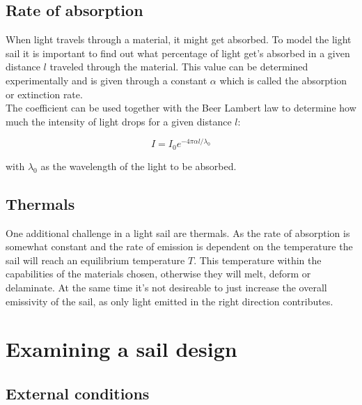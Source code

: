 \documentclass[14pt]{article}
\begin{document}
\subsection{Rate of absorption}
When light travels through a material, it might get absorbed. To model the light sail it is important to find out what percentage of light get's
absorbed in a given distance $l$ traveled through the material. This value can be determined experimentally and is given through a constant
$\alpha$ which is called the absorption or extinction rate. 
\\
The coefficient can be used together with the Beer Lambert law to determine how much the intensity of light drops for a given distance $l$:

\begin{equation}
  I = I_0 e^{- 4 \pi \alpha l / \lambda_0 }
  \label{eq:absorption}
\end{equation}


with $\lambda_0$ as the wavelength of the light to be absorbed.

\subsection{Thermals}

One additional challenge in a light sail are thermals. As the rate of absorption is somewhat constant and the rate of emission is dependent on the temperature
the sail will reach an equilibrium temperature $T$. This temperature within the capabilities of the materials chosen, otherwise they will melt, deform or
delaminate. At the same time it's not desireable to just increase the overall emissivity of the sail, as only light emitted in the right direction contributes.

\section{Examining a sail design}

\subsection{External conditions}
\end{document}
